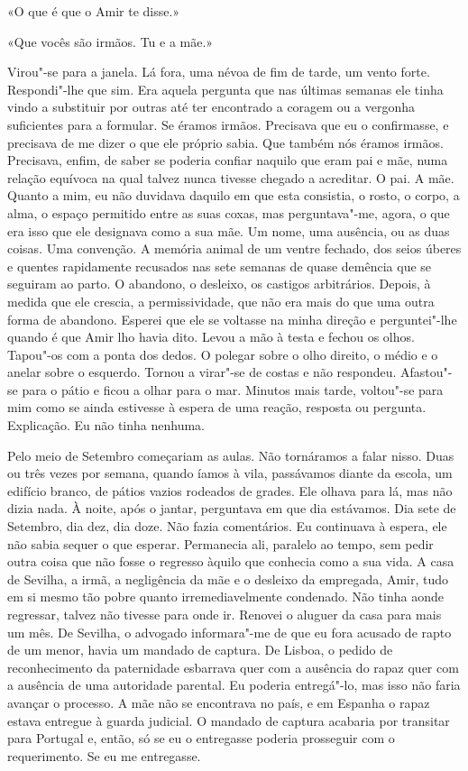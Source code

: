 «O que é que o Amir te disse.»

«Que vocês são irmãos. Tu e a mãe.»

Virou"-se para a janela. Lá fora, uma névoa de fim de tarde, um vento
forte. Respondi"-lhe que sim. Era aquela pergunta que nas últimas
semanas ele tinha vindo a substituir por outras até ter encontrado a
coragem ou a vergonha suficientes para a formular. Se éramos irmãos.
Precisava que eu o confirmasse, e precisava de me dizer o que ele
próprio sabia. Que também nós éramos irmãos. Precisava, enfim, de saber
se poderia confiar naquilo que eram pai e mãe, numa relação equívoca na
qual talvez nunca tivesse chegado a acreditar. O pai. A mãe. Quanto a
mim, eu não duvidava daquilo em que esta consistia, o rosto, o corpo, a
alma, o espaço permitido entre as suas coxas, mas perguntava"-me, agora,
o que era isso que ele designava como a sua mãe. Um nome, uma ausência,
ou as duas coisas. Uma convenção. A memória animal de um ventre fechado,
dos seios úberes e quentes rapidamente recusados nas sete semanas de
quase demência que se seguiram ao parto. O abandono, o desleixo, os
castigos arbitrários. Depois, à medida que ele crescia, a
permissividade, que não era mais do que uma outra forma de abandono.
Esperei que ele se voltasse na minha direção e perguntei"-lhe quando é
que Amir lho havia dito. Levou a mão à testa e fechou os olhos.
Tapou"-os com a ponta dos dedos. O polegar sobre o olho direito, o médio
e o anelar sobre o esquerdo. Tornou a virar"-se de costas e não
respondeu. Afastou"-se para o pátio e ficou a olhar para o mar. Minutos
mais tarde, voltou"-se para mim como se ainda estivesse à espera de uma
reação, resposta ou pergunta. Explicação. Eu não tinha nenhuma.

Pelo meio de Setembro começariam as aulas. Não tornáramos a falar nisso.
Duas ou três vezes por semana, quando íamos à vila, passávamos diante da
escola, um edifício branco, de pátios vazios rodeados de grades. Ele
olhava para lá, mas não dizia nada. À noite, após o jantar, perguntava
em que dia estávamos. Dia sete de Setembro, dia dez, dia doze. Não fazia
comentários. Eu continuava à espera, ele não sabia sequer o que esperar.
Permanecia ali, paralelo ao tempo, sem pedir outra coisa que não fosse o
regresso àquilo que conhecia como a sua vida. A casa de Sevilha, a irmã,
a negligência da mãe e o desleixo da empregada, Amir, tudo em si mesmo
tão pobre quanto irremediavelmente condenado. Não tinha aonde regressar,
talvez não tivesse para onde ir. Renovei o aluguer da casa para mais um
mês. De Sevilha, o advogado informara"-me de que eu fora acusado de
rapto de um menor, havia um mandado de captura. De Lisboa, o pedido de
reconhecimento da paternidade esbarrava quer com a ausência do rapaz
quer com a ausência de uma autoridade parental. Eu poderia entregá"-lo,
mas isso não faria avançar o processo. A mãe não se encontrava no país,
e em Espanha o rapaz estava entregue à guarda judicial. O mandado de
captura acabaria por transitar para Portugal e, então, só se eu o
entregasse poderia prosseguir com o requerimento. Se eu me entregasse.

